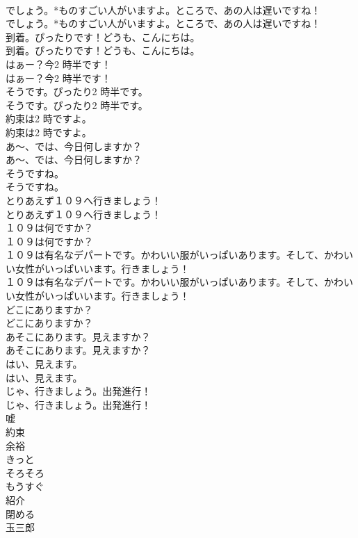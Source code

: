\documentclass[8pt]{extreport}
\begin{document}
\begin{CJK}{UTF8}{min}
\\	でしょう。*ものすごい人がいますよ。ところで、あの人は遅いですね！	
\\	でしょう。*ものすごい人がいますよ。ところで、あの人は遅いですね！ 
\\	到着。ぴったりです！どうも、こんにちは。	
\\	到着。ぴったりです！どうも、こんにちは。 
\\	はぁー？今2 時半です！	
\\	はぁー？今2 時半です！ 
\\	そうです。ぴったり2 時半です。	
\\	そうです。ぴったり2 時半です。 
\\	約束は2 時ですよ。	
\\	約束は2 時ですよ。 
\\	あ～、では、今日何しますか？	
\\	あ～、では、今日何しますか？ 
\\	そうですね。	
\\	そうですね。 
\\	とりあえず１０９へ行きましょう！	
\\	とりあえず１０９へ行きましょう！ 
\\	１０９は何ですか？	
\\	１０９は何ですか？ 
\\	１０９は有名なデパートです。かわいい服がいっぱいあります。そして、かわいい女性がいっぱいいます。行きましょう！	
\\	１０９は有名なデパートです。かわいい服がいっぱいあります。そして、かわいい女性がいっぱいいます。行きましょう！ 
\\	どこにありますか？	
\\	どこにありますか？ 
\\	あそこにあります。見えますか？	
\\	あそこにあります。見えますか？ 
\\	はい、見えます。	
\\	はい、見えます。 
\\	じゃ、行きましょう。出発進行！	
\\	じゃ、行きましょう。出発進行！ 
\\	嘘
\\	約束
\\	余裕
\\	きっと
\\	そろそろ
\\	もうすぐ
\\	紹介
\\	閉める
\\	玉三郎

\end{CJK}
\end{document}

